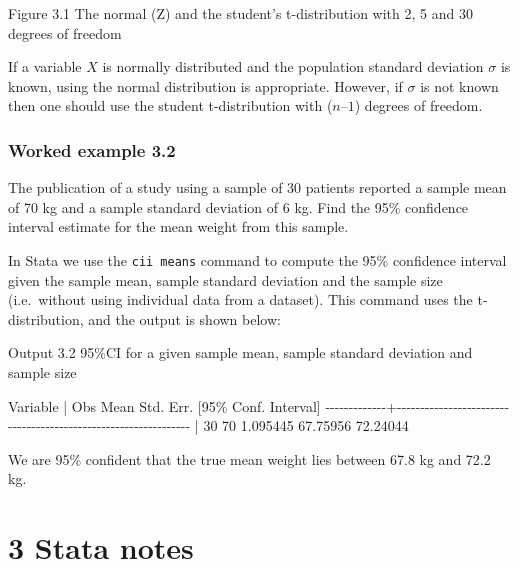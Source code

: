 \documentclass[
]{memoir}
\newenvironment{Shaded}{\begin{snugshade}}{\end{snugshade}}
\newcommand{\NormalTok}[1]{#1}
\begin{document}
Figure 3.1 The normal (Z) and the student's t-distribution with 2, 5 and 30 degrees of freedom

If a variable \(X\) is normally distributed and the population standard deviation \(\sigma\) is known, using the normal distribution is appropriate. However, if \(\sigma\) is not known then one should use the student t-distribution with (\(n – 1\)) degrees of freedom.

\hypertarget{worked-example-3.2}{%
\subsection{Worked example 3.2}\label{worked-example-3.2}}

The publication of a study using a sample of 30 patients reported a sample mean of 70 kg and a sample standard deviation of 6 kg. Find the 95\% confidence interval estimate for the mean weight from this sample.

In Stata we use the \texttt{cii\ means} command to compute the 95\% confidence interval given the sample mean, sample standard deviation and the sample size (i.e.~without using individual data from a dataset). This command uses the t-distribution, and the output is shown below:

Output 3.2 95\%CI for a given sample mean, sample standard deviation and sample size

\begin{Shaded}
\begin{Highlighting}[]
\NormalTok{    Variable |        Obs        Mean    Std. Err.       [95\% Conf. Interval]}
\NormalTok{{-}{-}{-}{-}{-}{-}{-}{-}{-}{-}{-}{-}{-}+{-}{-}{-}{-}{-}{-}{-}{-}{-}{-}{-}{-}{-}{-}{-}{-}{-}{-}{-}{-}{-}{-}{-}{-}{-}{-}{-}{-}{-}{-}{-}{-}{-}{-}{-}{-}{-}{-}{-}{-}{-}{-}{-}{-}{-}{-}{-}{-}{-}{-}{-}{-}{-}{-}{-}{-}{-}{-}{-}{-}{-}{-}{-}}
\NormalTok{             |         30          70    1.095445        67.75956    72.24044}
\end{Highlighting}
\end{Shaded}

We are 95\% confident that the true mean weight lies between 67.8 kg and 72.2 kg.

\hypertarget{stata-notes-1}{%
\chapter*{\texorpdfstring{\textbf{3} Stata notes}{3 Stata notes}}\label{stata-notes-1}}
\end{document}
